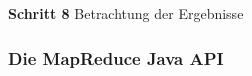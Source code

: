 \textbf{Schritt 8}
Betrachtung der Ergebnisse
\begin{comment}
Daher wird in diesem Beispiel stattdessen das \textbf{WebHDFS}\footnote{https://hadoop.apache.org/docs/r2.7.2/hadoop-project-dist/hadoop-hdfs/WebHDFS.html} benutzt.
\par
Das WebHDFS ist in der Sandbox bereits vollständig eingerichtet. Mit dessen Hilfe kann man ohne lokale Hadoop Installation per REST API mit dem HDFS interagieren. Man kann zum Beispiel auf seiner lokalen Maschine den Befehl zum Auflisten aller Dateien im \verb|/tmp/| Verzeichnis des HDFS mittels \verb|curl| absetzen. Dieser lautet 
\begin{lstlisting}[breaklines]
    curl -i "http://<hostname>:<port>/webhdfs/v1/tmp/?op=LISTSTATUS"
\end{lstlisting}
\begin{itemize}
    \item Mit der Option \verb|-i| werden die Response Header angezeigt.
    \item \verb|hostname| kann \verb|localhost| oder ein in der \verb|/etc/hosts| festgelegter Hostname für die Sandbox sein.
    \item Der Port ist standardmäßig \verb|50070|.
    \item Alles zwischen \verb|/v1| und \verb|?op| ist der Dateipfad.
    \item Der Parameter \verb|LISTSTATUS| ist der auszuführende HDFS Befehl.    
\end{itemize}

    

Abbildung \ref{fig:tmp list} zeigt die Ausgabe. Die Antwort ist ähnlich der eines typischen \verb|ls -l| Befehls: Zu sehen sind Dateien, deren Typ (hier vier mal 'DIRECTORY'), Zugriffsrechte, etc. 

\begin{figure}[ht]
    \centering
    \texttt{[image: webhdfs\_list\_tmp]}
    \caption[Dateiauflistung per WebHDFS]{Dateiauflistung per WebHDFS}
    \label{fig:tmp list}
\end{figure}
\end{comment}


\subsubsection*{Die MapReduce Java API}
\label{chap:fund sec:core sub:handson mapred}

